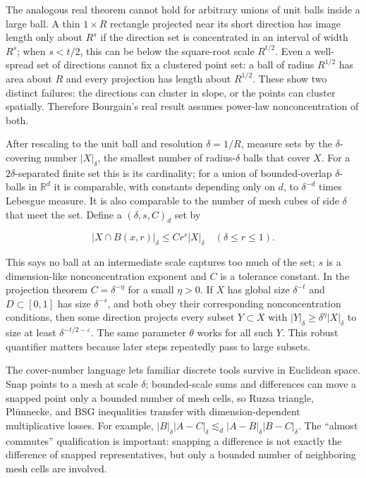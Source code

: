 The analogous real theorem cannot hold for arbitrary unions of unit balls inside a large ball. A thin \(1\times R\) rectangle projected near its short direction has image length only about \(R^s\) if the direction set is concentrated in an interval of width \(R^s\); when \(s<t/2\), this can be below the square-root scale \(R^{t/2}\). Even a well-spread set of directions cannot fix a clustered point set: a ball of radius \(R^{1/2}\) has area about \(R\) and every projection has length about \(R^{1/2}\). These show two distinct failures: the directions can cluster in slope, or the points can cluster spatially. Therefore Bourgain's real result assumes power-law nonconcentration of both.

After rescaling to the unit ball and resolution \(\delta=1/R\), measure sets by the \(\delta\)-covering number \(|X|_\delta\), the smallest number of radius-\(\delta\) balls that cover \(X\). For a \(2\delta\)-separated finite set this is its cardinality; for a union of bounded-overlap \(\delta\)-balls in \(\mathbb R^d\) it is comparable, with constants depending only on \(d\), to \(\delta^{-d}\) times Lebesgue measure. It is also comparable to the number of mesh cubes of side \(\delta\) that meet the set. Define a \((\delta,s,C)_d\) set by

\[|X\cap B(x,r)|_\delta\le Cr^s|X|_\delta\quad(\delta\le r\le1).\]

This says no ball at an intermediate scale captures too much of the set; \(s\) is a dimension-like nonconcentration exponent and \(C\) is a tolerance constant. In the projection theorem \(C=\delta^{-\eta}\) for a small \(\eta>0\). If \(X\) has global size \(\delta^{-t}\) and \(D\subset[0,1]\) has size \(\delta^{-s}\), and both obey their corresponding nonconcentration conditions, then some direction projects every subset \(Y\subset X\) with \(|Y|_\delta\ge\delta^{\eta}|X|_\delta\) to size at least \(\delta^{-t/2-\varepsilon}\). The same parameter \(\theta\) works for all such \(Y\). This robust quantifier matters because later steps repeatedly pass to large subsets.

The cover-number language lets familiar discrete tools survive in Euclidean space. Snap points to a mesh at scale \(\delta\); bounded-scale sums and differences can move a snapped point only a bounded number of mesh cells, so Ruzsa triangle, Plünnecke, and BSG inequalities transfer with dimension-dependent multiplicative losses. For example, \(|B|_\delta|A-C|_\delta\lesssim_d |A-B|_\delta|B-C|_\delta\). The ``almost commutes'' qualification is important: snapping a difference is not exactly the difference of snapped representatives, but only a bounded number of neighboring mesh cells are involved.

